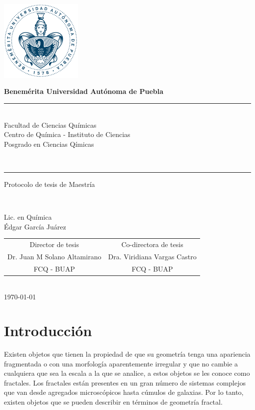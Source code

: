 \documentclass[11pt]{article}
\newcommand\vtab[1][0.5cm]{\vspace*{#1}}
\begin{document}
\pagestyle{empty} 
\phantom{a}
\vspace{-1.4cm}
\begin{center}
\includegraphics[width=4cm]{buap.pdf}

\Large{\textbf{Benemérita Universidad Autónoma de Puebla}\\
\rule{150mm}{0.1mm}\\
Facultad de Ciencias Químicas\\
Centro de Química - Instituto de Ciencias\\
Posgrado en Ciencias Qímicas}\\
\rule{150mm}{0.1mm}

\vtab[.1cm]
\Large{Protocolo de tesis de Maestría}\\
\vtab[0.2cm]

\large{\textbf{}}\\
\vtab[0.2cm]

Lic. en Química \\
Édgar García Juárez \\
\vtab[0.5cm]
\begin{tabular}{cc}
\vtab[10mm]
Director de tesis & Co-directora de tesis \\
Dr. Juan M Solano Altamirano & Dra. Viridiana Vargas Castro \\ 
FCQ - BUAP & FCQ - BUAP \\ 
\end{tabular} 
\vtab[1cm] \\
{\today}
\end{center}

\clearpage

\section{Introducción}



Existen objetos que tienen la propiedad de que su geometría tenga una apariencia fragmentada o con una morfología aparentemente irregular y que no cambie a cualquiera que sea la escala a la que se analice, a estos objetos se les conoce como fractales. Los fractales están presentes en un gran número de sistemas complejos que van desde agregados microscópicos hasta cúmulos de galaxias. Por lo tanto, existen objetos que se pueden describir en términos de geometría fractal. 
\end{document}
